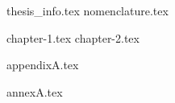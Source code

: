 \documentclass[english,phd,fctuc]{uc-thesis}
\begin{document}
\frontmatter
\renewcommand{\chaptermark}[1]{\markboth{\thechapter.\ #1}{}}

{thesis_info.tex}
{nomenclature.tex}

\makecover

\maketitlepage

\makededication

\makeacknowledgement

\makeabstract

\tableofcontents

\cleardoublepage

\listoffigures

\cleardoublepage

\listoftables

\cleardoublepage

\listofacronyms

\printnomenclature

\mainmatter
\renewcommand{\chaptermark}[1]{\markboth{\thechapter.\ #1}{}}

\fontsize{12}{12}\selectfont
{chapter-1.tex}
{chapter-2.tex}





\appendix
{appendixA.tex}

\annex
{annexA.tex}
\end{document}
